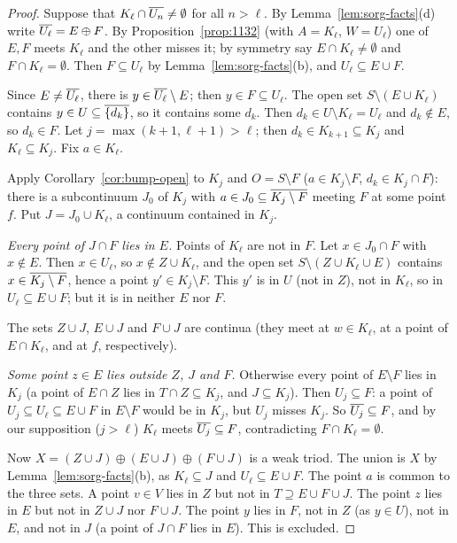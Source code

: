 \begin{proof}
Suppose that $K_\ell\cap\overline{U_n}\neq\emptyset$ for all $n>\ell$. By Lemma~\ref{lem:sorg-facts}(d)
write $\overline{U_\ell}=E\oplus F$. By Proposition~\ref{prop:1132} (with $A=K_\ell$, $W=U_\ell$) one of $E,F$
meets $K_\ell$ and the other misses it; by symmetry say $E\cap K_\ell\ne\emptyset$ and $F\cap
K_\ell=\emptyset$. Then $F\subseteq U_\ell$ by Lemma~\ref{lem:sorg-facts}(b), and $U_\ell\subseteq E\cup F$.

Since $E\ne\overline{U_\ell}$, there is $y\in\overline{U_\ell}\setminus E$; then $y\in F\subseteq U_\ell$. The open set
$S\setminus(E\cup K_\ell)$ contains $y\in U\subseteq\overline{\left\{ d_k \right\}}$, so it contains some $d_k$. Then
$d_k\in U\setminus K_\ell=U_\ell$ and $d_k\notin E$, so $d_k\in F$. Let $j=\max(k+1,\ell+1)>\ell$; then
$d_k\in K_{k+1}\subseteq K_j$ and $K_\ell\subseteq K_j$. Fix $a\in K_\ell$.

Apply Corollary~\ref{cor:bump-open} to $K_j$ and $O=S\setminus F$ ($a\in K_j\setminus F$, $d_k\in K_j\cap
F$): there is a subcontinuum $J_0$ of $K_j$ with $a\in J_0\subseteq\overline{K_j\setminus F}$ meeting $F$ at some
point $f$. Put $J=J_0\cup K_\ell$, a continuum contained in $K_j$.

\emph{Every point of $J\cap F$ lies in $E$.} Points of $K_\ell$ are not in $F$. Let $x\in J_0\cap F$
with $x\notin E$. Then $x\in U_\ell$, so $x\notin Z\cup K_\ell$, and the open set $S\setminus(Z\cup
K_\ell\cup E)$ contains $x\in\overline{K_j\setminus F}$, hence a point $y'\in K_j\setminus F$. This $y'$ is in
$U$ (not in $Z$), not in $K_\ell$, so in $U_\ell\subseteq E\cup F$; but it is in neither $E$ nor $F$.

The sets $Z\cup J$, $E\cup J$ and $F\cup J$ are continua (they meet at $w\in K_\ell$, at a point of
$E\cap K_\ell$, and at $f$, respectively).

\emph{Some point $z\in E$ lies outside $Z$, $J$ and $F$.} Otherwise every point of $E\setminus F$ lies in
$K_j$ (a point of $E\cap Z$ lies in $T\cap Z\subseteq K_j$, and $J\subseteq K_j$). Then $U_j\subseteq F$: a point
of $U_j\subseteq U_\ell\subseteq E\cup F$ in $E\setminus F$ would be in $K_j$, but $U_j$ misses $K_j$. So
$\overline{U_j}\subseteq F$, and by our supposition ($j>\ell$) $K_\ell$ meets $\overline{U_j}\subseteq F$, contradicting
$F\cap K_\ell=\emptyset$.

Now $X=(Z\cup J)\oplus(E\cup J)\oplus(F\cup J)$ is a weak triod. The union is $X$ by
Lemma~\ref{lem:sorg-facts}(b), as $K_\ell\subseteq J$ and $U_\ell\subseteq E\cup F$. The point $a$ is common
to the three sets. A point $v\in V$ lies in $Z$ but not in $T\supseteq E\cup F\cup J$. The point $z$ lies in
$E$ but not in $Z\cup J$ nor $F\cup J$. The point $y$ lies in $F$, not in $Z$ (as $y\in U$), not in $E$,
and not in $J$ (a point of $J\cap F$ lies in $E$). This is excluded.
\end{proof}

